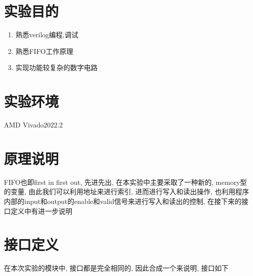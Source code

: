 \documentclass[fontset=windows,12pt]{article}
\begin{document}
\section{实验目的}
    \begin{enumerate}
        \item 熟悉verilog编程,调试
        \item 熟悉FIFO工作原理
        \item 实现功能较复杂的数字电路
    \end{enumerate}



\section{实验环境}
    AMD Vivado2022.2





\section{原理说明}
    FIFO也即first in first out, 先进先出, 在本实验中主要采取了一种新的, memory型的变量, 由此我们可以利用地址来进行索引,
    进而进行写入和读出操作, 也利用程序内部的input和output的enable和valid信号来进行写入和读出的控制, 在接下来的接口定义中有进一步说明
    


\section{接口定义}
    在本次实验的模块中, 接口都是完全相同的, 因此合成一个来说明, 接口如下
\end{document}
